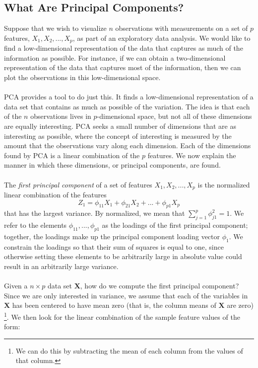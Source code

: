 \subsection{What Are Principal Components?}
Suppose that we wish to visualize $n$ observations with measurements on a
set of $p$ features, $X_1, X_2,...,X_p$, as part of an exploratory data analysis. We would like to find a low-dimensional representation of the data that captures as much of the information as possible. For instance, if we can obtain a two-dimensional representation of the data that captures most of the information, then we can plot the observations in this low-dimensional space.\\\\
PCA provides a tool to do just this. It finds a low-dimensional representation of a data set that contains as much as possible of the variation. The idea is that each of the $n$ observations lives in $p$-dimensional space, but not all of these dimensions are equally interesting. PCA seeks a small number of dimensions that are as interesting as possible, where the concept of interesting is measured by the amount that the observations vary along each dimension.  Each of the dimensions found by PCA is a linear combination of the $p$ features. We now explain the manner in which these dimensions, or principal components, are found.\\\\
The \textit{first principal component} of a set of features $X_1, X_2,...,X_p$ is the normalized linear combination of the features
\[Z_1 = \phi_{11}X_1 + \phi_{21}X_2 + ... +\phi_{p1}X_p\]
that has the largest variance. By normalized, we mean that $\sum_{j=1}^p \phi_{j1}^2 = 1$. We refer to the elements $\phi_{11},...,\phi_{p1}$ as the loadings of the first principal component; together, the loadings make up the principal component loading vector $\phi_1$. We constrain the loadings so that their sum of squares is equal to one, since otherwise setting these elements to be arbitrarily large in absolute value could result in an arbitrarily large variance.\\\\
Given a $n \times p$ data set $\textbf{X}$, how do we compute the first principal component? Since we are only interested in variance, we assume that each of the variables in $\textbf{X}$ has been centered to have mean zero (that is, the column means of $\textbf{X}$ are zero) \footnote{We can do this by subtracting the mean of each column from the values of that column.}. We then look for the linear combination of the sample feature values of the form:
